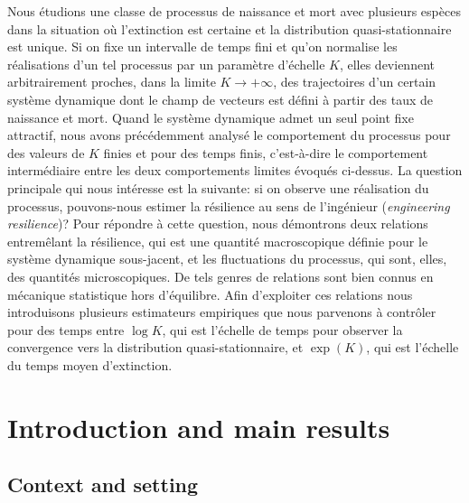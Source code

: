 \documentclass[JEP,XML,SOM,Unicode]{cedram}
\numberwithin{equation}{section}
\theoremstyle{plain}
\theoremstyle{definition}
\begin{document}
\begin{altabstract}
Nous étudions une classe de processus de naissance et mort avec plusieurs espèces dans la situation où l'extinction est certaine et la distribution quasi-stationnaire est unique. Si on fixe un intervalle de temps fini et qu'on normalise les réalisations d'un tel processus par un paramètre d'échelle $K$, elles deviennent arbitrairement proches, dans la limite $K\to+\infty$, des trajectoires d'un certain système dynamique dont le champ de vecteurs est défini à partir des taux de naissance et mort. Quand le système dynamique admet un seul point fixe attractif, nous avons précédemment analysé le comportement du processus pour des valeurs de $K$ finies et pour des temps finis, c'est-à-dire le comportement intermédiaire entre les deux comportements limites évoqués ci-dessus. La question principale qui nous intéresse est la suivante: si on observe une réalisation du processus, pouvons-nous estimer la résilience au sens de l'ingénieur (\emph{engineering resilience})? Pour répondre à cette question, nous démontrons deux relations entremêlant la résilience, qui est une quantité macroscopique définie pour le système dynamique sous-jacent, et les fluctuations du processus, qui sont, elles, des quantités microscopiques. De tels genres de relations sont bien connus en mécanique statistique hors d'équilibre. Afin d'exploiter ces relations nous introduisons plusieurs estimateurs empiriques que nous parvenons à contrôler pour des temps entre $\log K$, qui est l'échelle de temps pour observer la convergence vers la distribution quasi-stationnaire, et $\exp(K)$, qui est l'échelle du temps moyen d'extinction.
\end{altabstract}
\maketitle
\tableofcontents



\section{Introduction and main results}\label{sec:intro}

\subsection{Context and setting}
\end{document}
